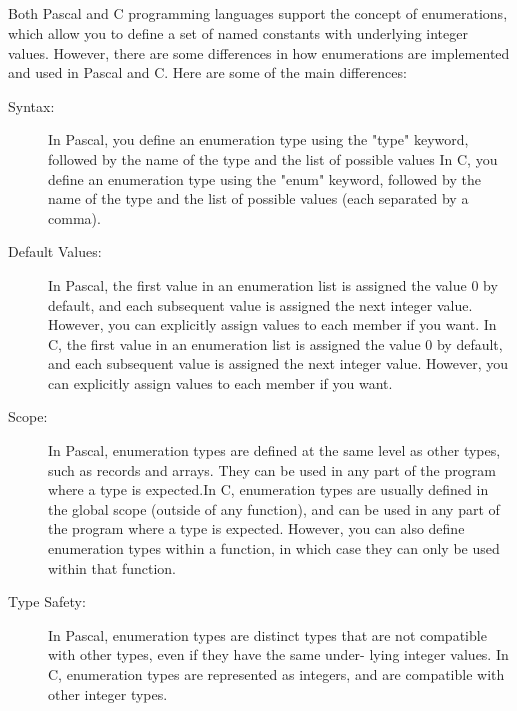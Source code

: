 \documentclass{article}
\begin{document}
\subsection{}
Both Pascal and C programming languages support the concept of enumerations, which allow you to define a set of named constants with
underlying integer values. However, there are some differences in how enumerations are implemented and used in Pascal and C. Here are
some of the main differences:
\begin{description}
    \item[Syntax:] In Pascal, you define an enumeration type using the "type" keyword, followed by the name of the type and the list of possible
        values In C, you define an enumeration type using the "enum" keyword, followed by the name of the type and the list of possible values
        (each separated by a comma).
    \item[Default Values:] In Pascal, the first value in an enumeration list is assigned the value 0 by default, and each subsequent value is assigned
        the next integer value. However, you can explicitly assign values to each member if you want. In C, the first value in an enumeration
        list is assigned the value 0 by default, and each subsequent value is assigned the next integer value. However, you can explicitly assign
        values to each member if you want.
    \item[Scope:] In Pascal, enumeration types are defined at the same level as other types, such as records and arrays. They can be used in any
        part of the program where a type is expected.In C, enumeration types are usually defined in the global scope (outside of any function),
        and can be used in any part of the program where a type is expected. However, you can also define enumeration types within a function,
        in which case they can only be used within that function.
    \item[Type Safety:] In Pascal, enumeration types are distinct types that are not compatible with other types, even if they have the same under-
        lying integer values. In C, enumeration types are represented as integers, and are compatible with other integer types.
\end{description}
\end{document}
